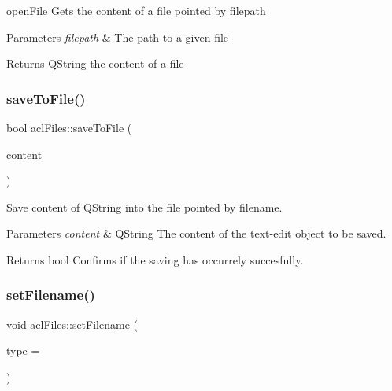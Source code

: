 open\+File Gets the content of a file pointed by filepath 


\begin{DoxyParams}{Parameters}
{\em filepath} & The path to a given file \\
\hline
\end{DoxyParams}
\begin{DoxyReturn}{Returns}
Q\+String the content of a file 
\end{DoxyReturn}
\mbox{\label{classaclFiles_a59acda65294b886be102ecf7e08ccf64}} 
\subsubsection{\texorpdfstring{save\+To\+File()}{saveToFile()}}
{\footnotesize\ttfamily bool acl\+Files\+::save\+To\+File (\begin{DoxyParamCaption}\item[{Q\+String}]{content }\end{DoxyParamCaption})}



Save content of Q\+String into the file pointed by filename. 


\begin{DoxyParams}{Parameters}
{\em content} & Q\+String The content of the text-\/edit object to be saved. \\
\hline
\end{DoxyParams}
\begin{DoxyReturn}{Returns}
bool Confirms if the saving has occurrely succesfully. 
\end{DoxyReturn}
\mbox{\label{classaclFiles_aa2948bd2ae50c0cd073da7ce73c5cbc5}} 
\subsubsection{\texorpdfstring{set\+Filename()}{setFilename()}}
{\footnotesize\ttfamily void acl\+Files\+::set\+Filename (\begin{DoxyParamCaption}\item[{bool}]{type = {} }\end{DoxyParamCaption})}



